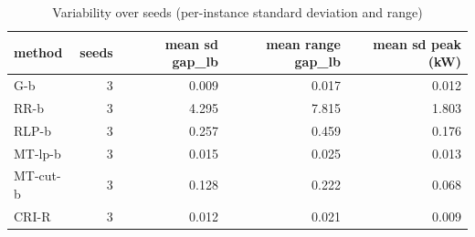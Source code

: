 \begin{table}[htbp]
\centering
\small
\caption{Variability over seeds (per-instance standard deviation and range)}
\label{tab:E2b_head_to_head_budgets_b10_seeds}
\begin{tabular}{lrrrr}
\toprule
method & seeds & mean sd gap\_lb & mean range gap\_lb & mean sd peak (kW) \\
\midrule
G-b & 3 & 0.009 & 0.017 & 0.012 \\
RR-b & 3 & 4.295 & 7.815 & 1.803 \\
RLP-b & 3 & 0.257 & 0.459 & 0.176 \\
MT-lp-b & 3 & 0.015 & 0.025 & 0.013 \\
MT-cut-b & 3 & 0.128 & 0.222 & 0.068 \\
CRI-R & 3 & 0.012 & 0.021 & 0.009 \\
\bottomrule
\end{tabular}
\end{table}

